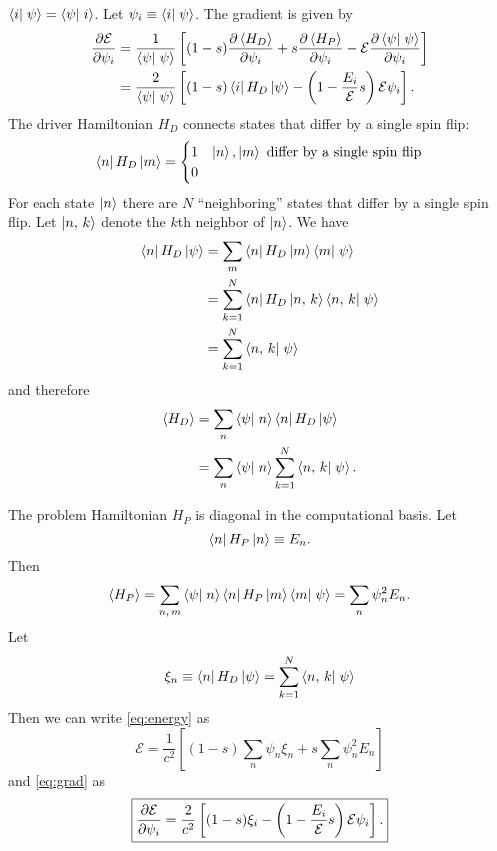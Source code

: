 $\braket{i}{\psi} = \braket{\psi}{i}$. Let $\psi_i \equiv \braket{i}{\psi}$.
The gradient is given by
\begin{align}
  \pd{\mathcal{E}}{\psi_i}
  &= \frac{1}{\braket{\psi}{\psi}}
  \left[ (1-s) \pd{\avg{H_D}}{\psi_i} + s \pd{\avg{H_P}}{\psi_i}
  - \mathcal{E} \pd{\braket{\psi}{\psi}}{\psi_i} \right] \\
  &= \frac{2}{\braket{\psi}{\psi}}
  \left[
    (1-s) \matrixel{i}{H_D}{\psi}
    - \left( 1 - \frac{E_i}{\mathcal{E}} s \right) \mathcal{E} \psi_i
  \right]. \label{eq:grad}
\end{align}
The driver Hamiltonian $H_D$ connects states that differ by a single spin flip:
\begin{equation}
  \matrixel{n}{H_D}{m}
  = \begin{cases}
    1 & \ket{n}, \ket{m} \text{ differ by a single spin flip} \\
    0
  \end{cases}
  \label{}
\end{equation}
For each state $\left| n \right>$ there are $N$ ``neighboring'' states that differ by a
single spin flip. Let $\left| n,\,k \right>$ denote the $k$th neighbor of
$\left| n \right>$. We have
\begin{align}
  \matrixel{n}{H_D}{\psi}
  &= \sum_m \matrixel{n}{H_D}{m} \braket{m}{\psi} \\
  &= \sum_{k=1}^N \matrixel{n}{H_D}{\nghbr{n}{k}} \braket{\nghbr{n}{k}}{\psi} \\
  &= \sum_{k=1}^N \braket{\nghbr{n}{k}}{\psi}
  \label{}
\end{align}
and therefore
\begin{align}
  \avg{H_D}
  &= \sum_n \braket{\psi}{n} \matrixel{n}{H_D}{\psi} \\
  &= \sum_n \braket{\psi}{n} \sum_{k=1}^{N} \braket{\nghbr{n}{k}}{\psi}.
  \label{}
\end{align}

The problem Hamiltonian $H_P$ is diagonal in the computational basis. Let
\begin{equation}
  \matrixel{n}{H_P}{n} \equiv E_n.
  \label{}
\end{equation}
Then
\begin{equation}
  \avg{H_P}
  = \sum_{n,\,m} \braket{\psi}{n} \matrixel{n}{H_P}{m} \braket{m}{\psi}
  = \sum_n \psi_n^2 E_n.
  \label{}
\end{equation}
Let
\begin{equation}
  \xi_n
  \equiv \matrixel{n}{H_D}{\psi}
  = \sum_{k=1}^N \braket{\nghbr{n}{k}}{\psi}
  \label{}
\end{equation}
Then we can write \eqref{eq:energy} as
\begin{equation}
  \boxed{
    \mathcal{E}
    = \frac{1}{c^2} \left[ (1-s) \sum_n \psi_n \xi_n + s \sum_n \psi_n^2 E_n \right]
  }
  \label{}
\end{equation}
and \eqref{eq:grad} as
\begin{equation}
  \boxed{
    \frac{\partial \mathcal{E}}{\partial \psi_i}
    = \frac{2}{c^2}
    \left[ (1-s) \xi_i -
      \left(1 - \frac{E_i}{\mathcal{E}} s \right)
      \mathcal{E} \psi_i
    \right].
  }
  \label{}
\end{equation}



